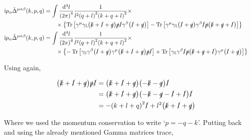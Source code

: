 \begin{align}
    \textnormal{i} p_\alpha{\tilde\Delta}^{\mu\alpha\beta}\qty(k,p,q)&=
    \int\frac{\dd[4]{l}}{\qty(2\pi)^4}\frac{1}{l^2\qty(q+l)^2\qty(k+q+l)^2}\times\nonumber\\
    &\quad\quad\times\qty{
    \Tr\qty[\gamma^\mu\gamma_5\qty(\slashed {k}+\slashed{l}+\slashed q)\slashed p\slashed {l}\gamma^\beta \qty(\slashed {l}+\slashed q)]
    -\Tr\qty[\gamma^\mu\gamma_5\qty(\slashed {l}+\slashed q)\gamma^\beta\slashed {l}\slashed p \qty(\slashed {k}+\slashed{q}+\slashed l)]}\nonumber\\
    \textnormal{i} p_\alpha{\tilde\Delta}^{\mu\alpha\beta}\qty(k,p,q)&=
    \int\frac{\dd[4]{l}}{\qty(2\pi)^4}\frac{1}{l^2\qty(q+l)^2\qty(k+q+l)^2}\times\nonumber\\
    &\quad\quad\times\qty{
    -\Tr\qty[\gamma_5\gamma^\beta \qty(\slashed {l}+\slashed q)\gamma^\mu\qty(\slashed {k}+\slashed{l}+\slashed q)\slashed p\slashed {l}]
    +\Tr\qty[\gamma_5\gamma^\beta\slashed {l}\slashed p \qty(\slashed {k}+\slashed{q}+\slashed l)\gamma^\mu\qty(\slashed {l}+\slashed q)]}\nonumber
\end{align}

Using again,

\begin{align}
    \qty(\slashed k+\slashed l+\slashed q)\slashed p\slashed l&=\qty(\slashed k+\slashed l+\slashed q)\qty(-\slashed k-\slashed q)\slashed l\nonumber\\
    &=\qty(\slashed k+\slashed l+\slashed q)\qty(-\slashed k-\slashed q-\slashed l+\slashed l)\slashed l\nonumber\\
    &=-\qty(k+l+q)^2\slashed l+l^2\qty(\slashed k+\slashed l+\slashed q)\nonumber
\end{align}

Where we used the momentum conservation to write `$p=-q-k$'. Putting back and using the already mentioned 
Gamma matrices trace,

